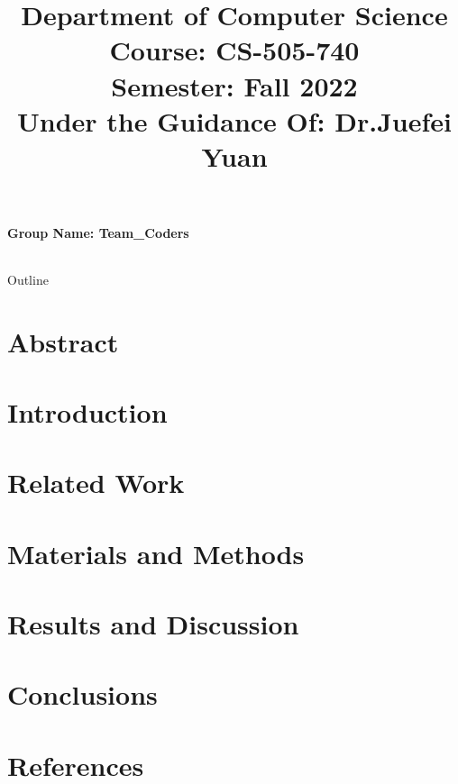 \documentclass[9pt]{beamer}
\title[CS-505-740]{Department of Computer Science Course: CS-505-740\\Semester: Fall 2022\\Under the Guidance Of:  Dr.Juefei Yuan} %
\author[]{ 
} %
\institute[]{\large South East Missouri State University}
\date{}
\begin{document}

\begin{frame}[plain]
    \maketitle
    \centering\textbf{Group Name: Team\_Coders\\}
    \begin{table}[]
        \begin{tabular}{lll}
        \end{tabular}
    \end{table}
    
\end{frame}


\begin{frame}{Outline}
  \tableofcontents
\end{frame}

\section{Abstract}
    
\section{Introduction}
    
\section{Related Work}
    
\section{Materials and Methods}
    
\section{Results and Discussion}
    
\section{Conclusions}
    
\section{References}
    
\end{document}
